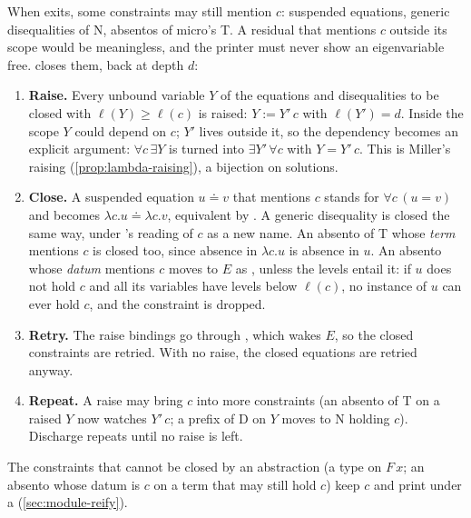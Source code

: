 When  exits, some constraints may still mention $c$: suspended equations, generic disequalities of N,
absentos of micro's T. A residual that mentions $c$ outside its scope would be meaningless, and the printer
must never show an eigenvariable free.  closes them, back at depth $d$:
\begin{enumerate}
  \item \textbf{Raise.} Every unbound variable $Y$ of the equations and disequalities to be closed with
    $\ell(Y)\ge\ell(c)$ is raised:
    $Y := Y'\,c$ with $\ell(Y')=d$. Inside the scope $Y$ could depend on $c$; $Y'$ lives outside it, so the
    dependency becomes an explicit argument: $\forall c\,\exists Y$ is turned into $\exists Y'\,\forall c$
    with $Y = Y'\,c$. This is Miller's raising  (\cref{prop:lambda-raising}), a bijection
    on solutions.
  \item \textbf{Close.} A suspended equation $u \doteq v$ that mentions $c$ stands for
    $\forall c\,(u = v)$ and becomes $\lambda c.u \doteq \lambda c.v$, equivalent by . A generic
    disequality is closed the same way, under 's reading of $c$ as a new name. An absento of T whose
    \emph{term} mentions $c$ is closed too, since absence in $\lambda c.u$ is absence in $u$. An absento whose
    \emph{datum} mentions $c$ moves to $E$ as , unless the levels entail it: if $u$ does not
    hold $c$ and all its variables have levels below $\ell(c)$, no instance of $u$ can ever hold $c$, and the
    constraint is dropped.
  \item \textbf{Retry.} The raise bindings go through , which wakes $E$, so the closed
    constraints are retried. With no raise, the closed equations are retried anyway.
  \item \textbf{Repeat.} A raise may bring $c$ into more constraints (an absento of T on a raised $Y$ now
    watches $Y'\,c$; a prefix of D on $Y$ moves to N holding $c$). Discharge repeats until no raise is left.
\end{enumerate}
The constraints that cannot be closed by an abstraction (a type on $F\,x$; an absento whose datum is $c$ on a
term that may still hold $c$) keep $c$ and print under a  (\cref{sec:module-reify}).

